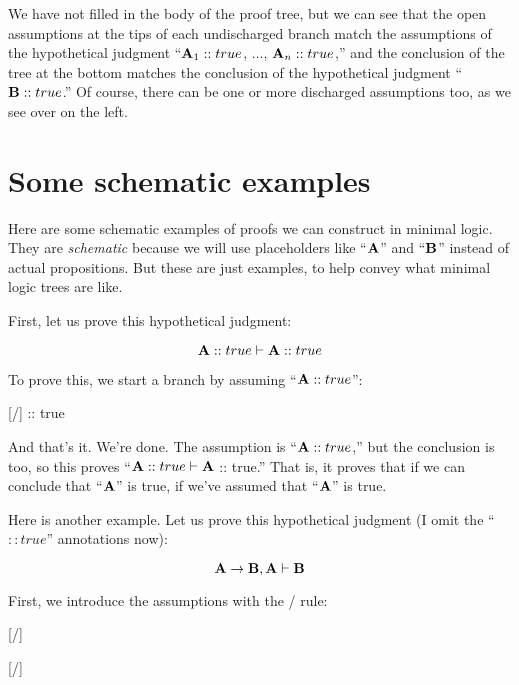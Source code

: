 \documentclass[../../../main.tex]{subfiles}
\begin{document}
\noindent
We have not filled in the body of the proof tree, but we can see that the open assumptions at the tips of each undischarged branch match the assumptions of the hypothetical judgment ``$\mathbf{A}_{1} :: true$, $\ldots$, $\mathbf{A}_{n} :: true$,'' and the conclusion of the tree at the bottom matches the conclusion of the hypothetical judgment ``$\mathbf{B} :: true$.'' Of course, there can be one or more discharged assumptions too, as we see over on the left.


\section{Some schematic examples}

Here are some schematic examples of proofs we can construct in minimal logic. They are \emph{schematic} because we will use placeholders like ``$\mathbf{A}$'' and ``$\mathbf{B}$'' instead of actual propositions. But these are just examples, to help convey what minimal logic trees are like.

First, let us prove this hypothetical judgment:

\begin{equation*}
  \nd{A} :: true \ndturnstile/ \nd{A} :: true
\end{equation*}

\noindent
To prove this, we start a branch by assuming ``$\mathbf{A} :: true$'':

\begin{prooftree*}
  \hypo{}
  [\startrule/]{ :: true}
\end{prooftree*}

\noindent
And that's it. We're done. The assumption is ``$\mathbf{A} :: true$,'' but the conclusion is too, so this proves ``$\nd{A} :: true \ndturnstile/ \nd{A}$ :: true.'' That is, it proves that if we can conclude that ``$\mathbf{A}$'' is true, if we've assumed that ``$\mathbf{A}$'' is true.

Here is another example. Let us prove this hypothetical judgment (I omit the ``$:: true$'' annotations now):

\begin{equation*}
  \nd{A \impl/ B}, \nd{A} \ndturnstile/ \nd{B}
\end{equation*}

\noindent
First, we introduce the assumptions with the \startrule/ rule:

\begin{prooftree*}
  \hypo{}
  [\startrule/]{}
  
  \hypo{}
  [\startrule/]{}
  
\end{prooftree*}
\end{document}
